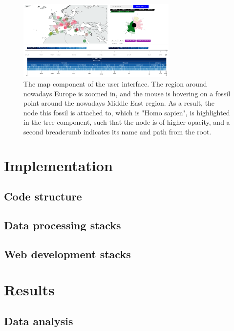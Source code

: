 \documentclass[11pt, a4paper,oneside,chapterprefix=false]{scrbook}
\begin{document}
\begin{figure}[h]
	\centering
	\includegraphics[width=0.7\textwidth]{figures/technical_solution/map}
	\caption{The map component of the user interface. The region around nowadays Europe is zoomed in, and the mouse is hovering on a fossil point around the nowadays Middle East region. As a result, the node this fossil is attached to, which is "Homo sapien", is highlighted in the tree component, such that the node is of higher opacity, and a second breadcrumb indicates its name and path from the root. }
	\label{fig:map}
\end{figure}

\chapter{Implementation} \label{chp:implementation}
\section{Code structure} \label{sec:implementation_code_structure}
\section{Data processing stacks}\label{sec:implementation_data_processing}
\section{Web development stacks}\label{sec:implementation_web_development}

\chapter{Results} \label{chp:results}
\section{Data analysis} \label{sec:result_data_analysis}
\end{document}
